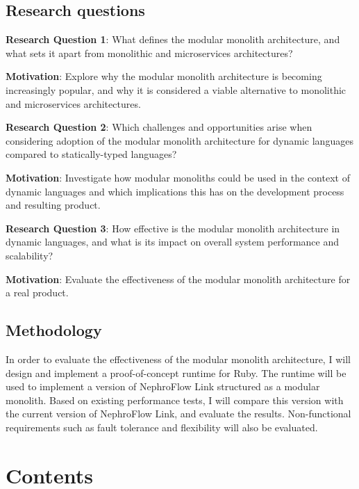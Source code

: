 \documentclass[12pt]{article}
\begin{document}
	\clearpage

	\subsection*{Research questions}\label{subsec:research-questions}

	\textbf{Research Question 1}: What defines the modular monolith architecture, and what sets it apart from monolithic and microservices architectures?

	\textbf{Motivation}: Explore why the modular monolith architecture is becoming increasingly popular, and why it is considered a viable alternative to monolithic and microservices architectures.

	\textbf{Research Question 2}: Which challenges and opportunities arise when considering adoption of the modular monolith architecture for dynamic languages compared to statically-typed languages?

	\textbf{Motivation}: Investigate how modular monoliths could be used in the context of dynamic languages and which implications this has on the development process and resulting product.

	\textbf{Research Question 3}: How effective is the modular monolith architecture in dynamic languages, and what is its impact on overall system performance and scalability?

	\textbf{Motivation}: Evaluate the effectiveness of the modular monolith architecture for a real product.

	\clearpage

	\subsection*{Methodology}\label{subsec:methodology}

	In order to evaluate the effectiveness of the modular monolith architecture, I will design and implement a proof-of-concept runtime for Ruby.
	The runtime will be used to implement a version of NephroFlow Link structured as a modular monolith.
	Based on existing performance tests, I will compare this version with the current version of NephroFlow Link, and evaluate the results.
	Non-functional requirements such as fault tolerance and flexibility will also be evaluated.

	\clearpage

	\section*{Contents}\label{sec:contents}
\end{document}
